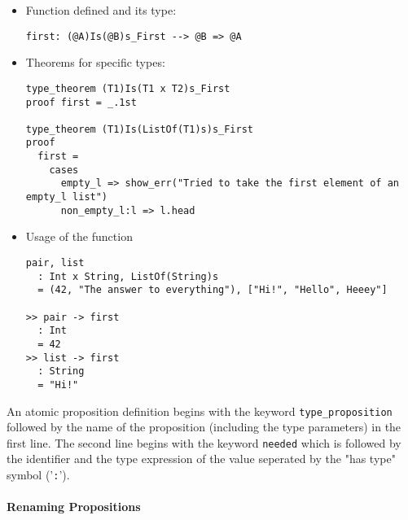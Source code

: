 \documentclass{article}
\begin{document}
\begin{itemize}
\begin{itemize}
\item Function defined and its type:

\begin{verbatim}
first: (@A)Is(@B)s_First --> @B => @A
\end{verbatim}

\item Theorems for specific types:

\begin{verbatim}
type_theorem (T1)Is(T1 x T2)s_First
proof first = _.1st

type_theorem (T1)Is(ListOf(T1)s)s_First
proof
  first =
    cases
      empty_l => show_err("Tried to take the first element of an empty_l list")
      non_empty_l:l => l.head
\end{verbatim}

\item Usage of the function
\begin{verbatim}
pair, list
  : Int x String, ListOf(String)s
  = (42, "The answer to everything"), ["Hi!", "Hello", Heeey"]

>> pair -> first
  : Int
  = 42
>> list -> first
  : String
  = "Hi!"
\end{verbatim}
\end{itemize}

An atomic proposition definition begins with the keyword
\texttt{type_proposition} followed by the name of the proposition (including
the type parameters) in the first line. The second line begins with the keyword
\texttt{needed} which is followed by the identifier and the
type expression of the value seperated by the "has type" symbol ('\texttt{:}').

\end{itemize}

\paragraph{Renaming Propositions}
\end{document}
